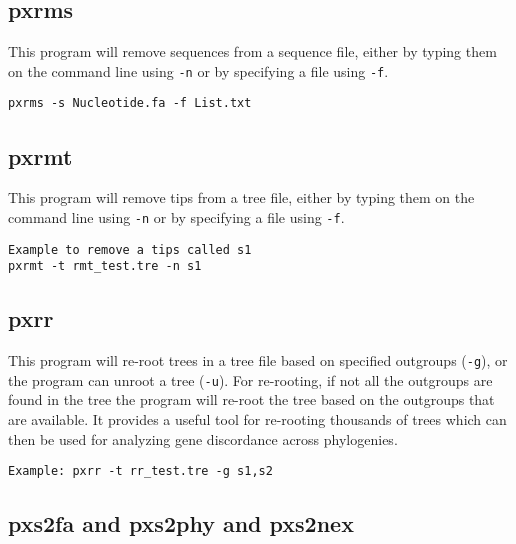 \documentclass[12pt,letterpaper]{memoir}
\begin{document}
\subsection{pxrms}

This program will remove sequences from a sequence file, either by typing them on the command line using \texttt{-n} or by specifying a file using \texttt{-f}.

\begin{flushleft}
\begin{verbatim}
pxrms -s Nucleotide.fa -f List.txt
\end{verbatim}
\end{flushleft}

\subsection{pxrmt}

This program will remove tips from a tree file, either by typing them on the command line using \texttt{-n} or by specifying a file using \texttt{-f}.

\begin{flushleft}
\begin{verbatim}
Example to remove a tips called s1
pxrmt -t rmt_test.tre -n s1
\end{verbatim}
\end{flushleft}

\subsection{pxrr}

This program will re-root trees in a tree file based on specified outgroups (\texttt{-g}), or the program can unroot a tree (\texttt{-u}). For re-rooting, if not all the outgroups are found in the tree the program will re-root the tree based on the outgroups that are available. It provides a useful tool for re-rooting thousands of trees which can then be used for analyzing gene discordance across phylogenies.

\begin{flushleft}
\begin{verbatim}
Example: pxrr -t rr_test.tre -g s1,s2
\end{verbatim}
\end{flushleft}

\subsection{pxs2fa and pxs2phy and  pxs2nex}
\end{document}

